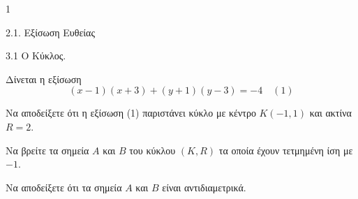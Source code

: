 \begin{ylh}{1}
    \item 2.1. Εξίσωση Ευθείας
    \item 3.1 Ο Κύκλος.
\end{ylh}
Δίνεται η εξίσωση
\[ (x - 1)(x + 3) + (y + 1)(y - 3) = -4 \quad (1) \]
\begin{alist}
    \item Να αποδείξετε ότι η εξίσωση (1) παριστάνει κύκλο με κέντρο $K(-1,1)$ και ακτίνα $R = 2$. 
    \item
    \begin{rlist}
        \item Να βρείτε τα σημεία $A$ και $B$ του κύκλου $(K,R)$ τα οποία έχουν τετμημένη ίση με $-1$. 
        \item Να αποδείξετε ότι τα σημεία $A$ και $B$ είναι αντιδιαμετρικά. 
    \end{rlist}
\end{alist}